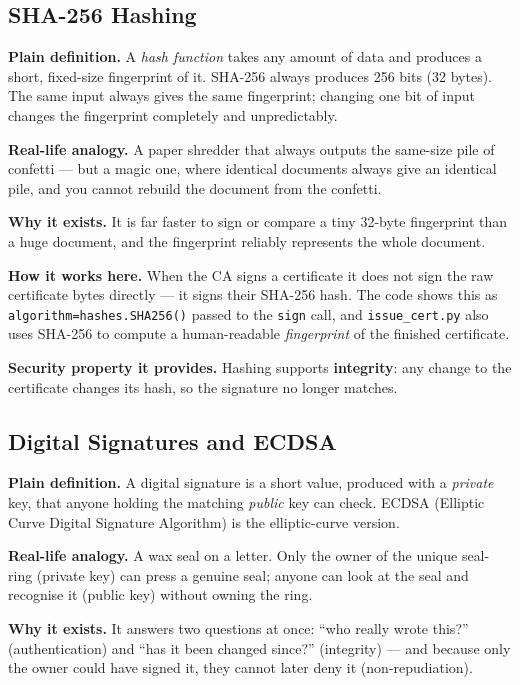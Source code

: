 \documentclass[11pt,a4paper]{article}
\begin{document}
\subsection{SHA-256 Hashing}
\textbf{Plain definition.} A \emph{hash function} takes any amount of data and
produces a short, fixed-size fingerprint of it. SHA-256 always produces 256 bits
(32 bytes). The same input always gives the same fingerprint; changing one bit
of input changes the fingerprint completely and unpredictably.

\textbf{Real-life analogy.} A paper shredder that always outputs the same-size
pile of confetti --- but a magic one, where identical documents always give an
identical pile, and you cannot rebuild the document from the confetti.

\textbf{Why it exists.} It is far faster to sign or compare a tiny 32-byte
fingerprint than a huge document, and the fingerprint reliably represents the
whole document.

\textbf{How it works here.} When the CA signs a certificate it does not sign the
raw certificate bytes directly --- it signs their SHA-256 hash. The code shows
this as \texttt{algorithm=hashes.SHA256()} passed to the \texttt{sign} call, and
\texttt{issue\_cert.py} also uses SHA-256 to compute a human-readable
\emph{fingerprint} of the finished certificate.

\textbf{Security property it provides.} Hashing supports \textbf{integrity}: any
change to the certificate changes its hash, so the signature no longer matches.

\subsection{Digital Signatures and ECDSA}
\textbf{Plain definition.} A digital signature is a short value, produced with a
\emph{private} key, that anyone holding the matching \emph{public} key can check.
ECDSA (Elliptic Curve Digital Signature Algorithm) is the elliptic-curve version.

\textbf{Real-life analogy.} A wax seal on a letter. Only the owner of the unique
seal-ring (private key) can press a genuine seal; anyone can look at the seal and
recognise it (public key) without owning the ring.

\textbf{Why it exists.} It answers two questions at once: ``who really wrote
this?'' (authentication) and ``has it been changed since?'' (integrity) --- and
because only the owner could have signed it, they cannot later deny it
(non-repudiation).
\end{document}
